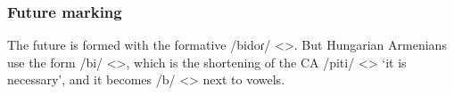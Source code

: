 \subsubsection{Future marking}

The future is formed with the formative /bidoɾ/ <>. But Hungarian Armenians use the form /bi/ <>, which is the shortening of the CA /piti/ <> `it is necessary', and it becomes /b/ <> next to vowels. 

\begin{adjarianpage}\label{page:272}\end{adjarianpage}%


